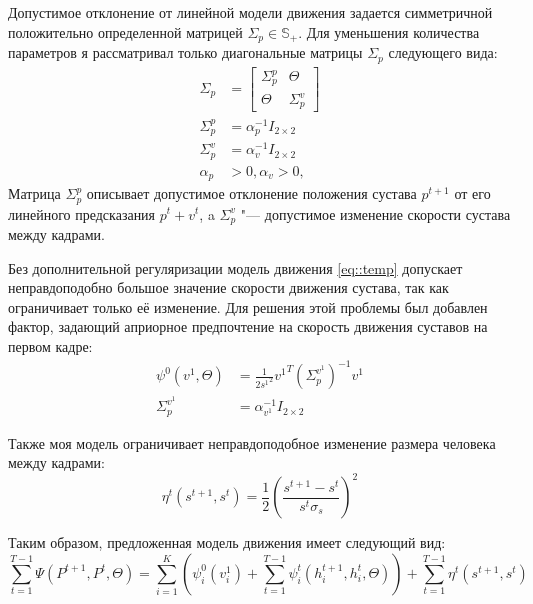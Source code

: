 Допустимое отклонение от линейной модели движения задается симметричной положительно определенной матрицей $\Sigma_p \in \mathbb{S_+}$. Для уменьшения количества параметров я рассматривал только диагональные матрицы $\Sigma_p$ следующего вида:
\begin{equation}
	\begin{aligned}
		\Sigma_p &= \left[
			\begin{array}{c|c}
			\Sigma_p^p & \Theta \\ \hline
			\Theta     & \Sigma_p^v
			\end{array}
			\right] \\
		\Sigma_p^p &= \alpha_p^{-1} I_{2\times2} \\
		\Sigma_p^v &= \alpha_v^{-1} I_{2\times2} \\
		\alpha_p &> 0, \alpha_v > 0,
		\label{eq::sigma}
	\end{aligned}
\end{equation}
Матрица $\Sigma_p^p$ описывает допустимое отклонение положения сустава $p^{t+1}$ от его линейного предсказания $p^t + v^t$, a $\Sigma_p^v$ "--- допустимое изменение скорости сустава между кадрами.

Без дополнительной регуляризации модель движения \eqref{eq::temp} допускает неправдоподобно большое значение скорости движения сустава, так как ограничивает только её изменение. Для решения этой проблемы был добавлен фактор, задающий априорное предпочтение на скорость движения суставов на первом кадре:
\begin{equation}
	\begin{aligned}
		\psi^0(v^1, \Theta) &= \frac{1}{2 {s^1}^2}{v^1}^T \left({\Sigma_p^{v^1}}\right)^{-1} v^1 \\
		\Sigma_p^{v^1} &= \alpha_{v^1}^{-1} I_{2\times2}
	\end{aligned}
\end{equation}

Также моя модель ограничивает неправдоподобное изменение размера человека между кадрами:
\begin{equation}
	\eta^t(s^{t+1}, s^t) = \frac{1}{2} \left(\frac{s^{t+1} - s^t}{s^t\sigma_s}\right)^2
\end{equation}

Таким образом, предложенная модель движения имеет следующий вид:
\begin{equation}
	\sum_{t=1}^{T-1}{\Psi(P^{t+1}, P^t, \Theta)} = 
		\sum_{i=1}^K\left(\psi^0_i(v^1_i) + \sum_{t=1}^{T-1}\psi_i^t(h_i^{t+1}, h_i^{t}, \Theta) \right) + \sum_{t=1}^{T-1} \eta^t(s^{t+1}, s^{t})
	\label{eq::motion_model}
\end{equation}

